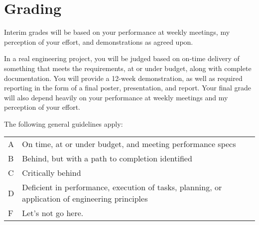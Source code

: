 \documentclass[10pt,courier]{navymemo}
\begin{document}
\section{Grading}
Interim grades will be based on your performance at weekly meetings, my perception of your effort, and demonstrations as agreed upon.  

In a real engineering project, you will be judged based on on-time delivery of something that meets the requirements, at or under budget, along with complete documentation. You will provide a 12-week demonstration, as well as required reporting in the form of a final poster, presentation, and report. Your final grade will also depend heavily on your performance at weekly meetings and my perception of your effort.

The following general guidelines apply: 
\begin{center}
\begin{tabular}{lp{5in}}
A & On time, at or under budget, and meeting performance specs \\
B & Behind, but with a path to completion identified \\
C & Critically behind \\
D & Deficient in performance, execution of tasks, planning, or application of engineering principles \\
F & Let's not go here. \\
\end{tabular}
\end{center}

\noclosing{}\\
\noindent\hspace*{4in}
\signature{D Evangelista}

\noindent\hspace*{4in}{235 Maury Hall}\\
\hspace*{4in}{(410) 293-6132}\\
\end{document}
